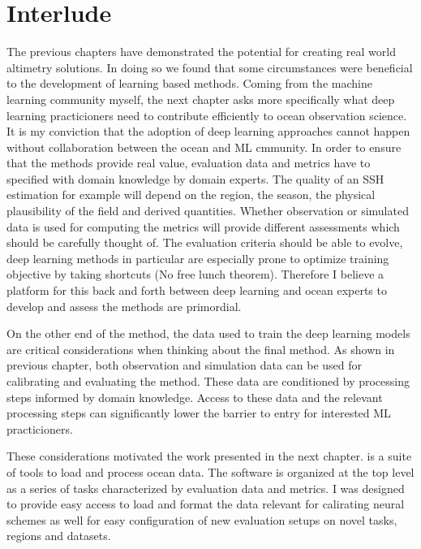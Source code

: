 \section{Interlude}
The previous chapters have demonstrated the potential for creating real world altimetry solutions.
In doing so we found that some circumstances were beneficial to the development of learning based methods.
Coming from the machine learning community myself, the next chapter asks more specifically what deep learning practicioners need to contribute efficiently to ocean observation science.
It is my conviction that the adoption of deep learning approaches cannot happen without collaboration between the ocean and ML cmmunity.
In order to ensure that the methods provide real value, evaluation data and metrics have to specified with domain knowledge by domain experts.
The quality of an SSH estimation for example will depend on the region, the season, the physical plausibility of the field and derived quantities.
Whether observation or simulated data is used for computing the metrics will provide different assessments which should be carefully thought of.
The evaluation criteria should be able to evolve, deep learning methods in particular are especially prone to optimize training objective by taking shortcuts (No free lunch theorem).
Therefore I believe a platform for this back and forth between deep learning and ocean experts to develop and assess the methods are primordial.

On the other end of the method, the data used to train the deep learning models are critical considerations when thinking about the final method.
As shown in previous chapter, both observation and simulation data can be used for calibrating and evaluating the method.
These data are conditioned by processing steps informed by domain knowledge. Access to these data and the relevant processing steps can significantly lower the barrier to entry for interested ML practicioners.


These considerations motivated the work presented in the next chapter.  is a suite of tools to load and process ocean data. The software is organized at the top level as a series of tasks characterized by evaluation data and metrics. I was designed to provide easy access to load and format the data relevant for calirating neural schemes as well for easy configuration of new evaluation setups on novel tasks, regions and datasets.


